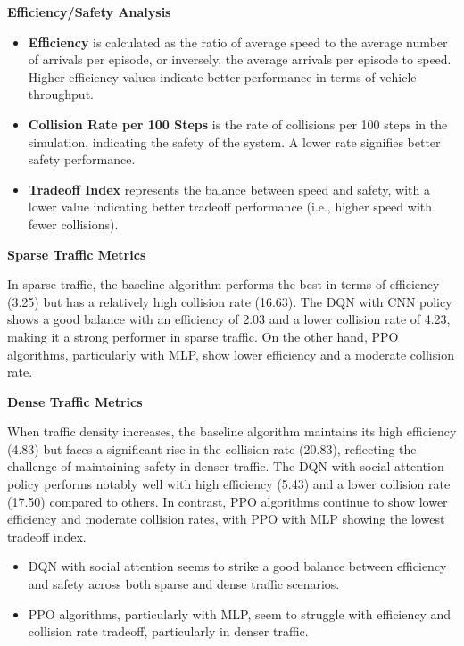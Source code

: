 \textbf{Efficiency/Safety Analysis}

\begin{itemize}
    \item \textbf{Efficiency} is calculated as the ratio of average speed to the average number of arrivals per episode, or inversely, the average arrivals per episode to speed. Higher efficiency values indicate better performance in terms of vehicle throughput.
    \item \textbf{Collision Rate per 100 Steps} is the rate of collisions per 100 steps in the simulation, indicating the safety of the system. A lower rate signifies better safety performance.
    \item \textbf{Tradeoff Index} represents the balance between speed and safety, with a lower value indicating better tradeoff performance (i.e., higher speed with fewer collisions).
\end{itemize}

\textbf{Sparse Traffic Metrics}

In sparse traffic, the baseline algorithm performs the best in terms of efficiency (3.25) but has a relatively high collision rate (16.63). The DQN with CNN policy shows a good balance with an efficiency of 2.03 and a lower collision rate of 4.23, making it a strong performer in sparse traffic. On the other hand, PPO algorithms, particularly with MLP, show lower efficiency and a moderate collision rate.

\textbf{Dense Traffic Metrics}

When traffic density increases, the baseline algorithm maintains its high efficiency (4.83) but faces a significant rise in the collision rate (20.83), reflecting the challenge of maintaining safety in denser traffic. The DQN with social attention policy performs notably well with high efficiency (5.43) and a lower collision rate (17.50) compared to others. In contrast, PPO algorithms continue to show lower efficiency and moderate collision rates, with PPO with MLP showing the lowest tradeoff index.

\begin{itemize}
    \item DQN with social attention seems to strike a good balance between efficiency and safety across both sparse and dense traffic scenarios.
    \item PPO algorithms, particularly with MLP, seem to struggle with efficiency and collision rate tradeoff, particularly in denser traffic.
\end{itemize}


